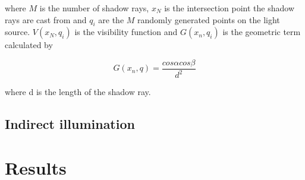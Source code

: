 \documentclass[twocolumn]{article}
\begin{document}
where $M$ is the number of shadow rays, $x_N$ is the intersection point the shadow rays are cast from and $q_i$ are the $M$ randomly generated points on the light source. $V(x_N, q_i)$ is the visibility function and $G(x_n, q_i)$ is the geometric term calculated by 

\begin{equation*}
	G(x_n, q) = \frac{cos\alpha cos\beta}{d^2}
\end{equation*}

where d is the length of the shadow ray.

\subsection{Indirect illumination}

\section{Results}


\newpage
\printbibliography
\end{document}
